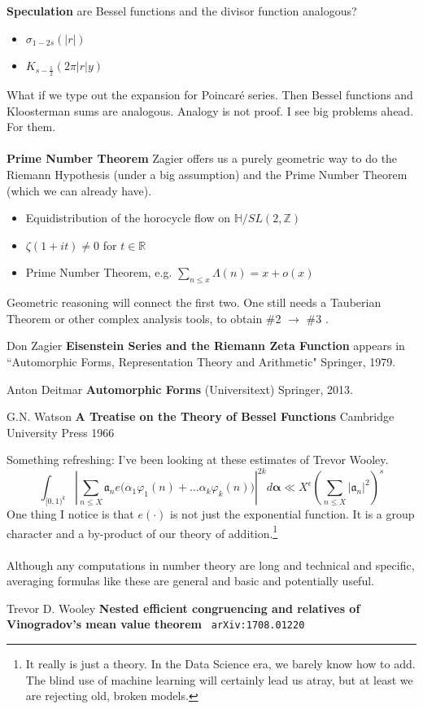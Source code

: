 \documentclass[12pt]{article}
\begin{document}
\textbf{\color{black!20!white}Speculation} are Bessel functions and the divisor function analogous?
\begin{itemize}
\item $\sigma_{1-2s}(|r|) $
\item $K_{s - \frac{1}{2}}(2\pi |r|y) $
\end{itemize}
What if we type out the expansion for Poincar\'{e} series.   Then Bessel functions and Kloosterman sums are analogous.  Analogy is not proof.  I see big problems ahead.  For them.  \\ \\
\textbf{\color{black!20!white!80!green}Prime Number Theorem} Zagier offers us a purely geometric way to do the Riemann Hypothesis (under a big assumption) and the Prime Number Theorem (which we can already have).
\begin{itemize}
\item Equidistribution of the horocycle flow on $\mathbb{H}/SL(2, \mathbb{Z})$
\item $\zeta(1 + it) \neq 0$ for $t \in \mathbb{R}$
\item Prime Number Theorem, e.g. $\sum_{n \leq x} \Lambda(n) = x +o(x)$
\end{itemize}
Geometric reasoning will connect the first two.  One still needs a Tauberian Theorem or other complex analysis tools, to obtain \#2 $\to$ \#3 .

\vfill
 
\begin{thebibliography}{}

\item Don Zagier \textbf{Eisenstein Series and the Riemann Zeta Function} appears in ``Automorphic Forms, Representation Theory and Arithmetic" Springer, 1979.

\item Anton Deitmar \textbf{Automorphic Forms} (Universitext) Springer, 2013.

\item G.N. Watson \textbf{A Treatise on the Theory of Bessel Functions} Cambridge University Press 1966 
\end{thebibliography}

\newpage

\noindent Something refreshing:  I've been looking at these estimates of Trevor Wooley.  
$$ \int_{[0,1)^k} \left| \sum_{n\leq X} \mathfrak{a}_n e \big( \alpha_1 \varphi_1(n) + \dots \alpha_k \varphi_k(n)\big) \right|^{2k} d\mathbf{\alpha}
 \ll X^\epsilon \left( \sum_{n\leq X} |\mathfrak{a}_n|^2 \right)^s $$
One thing I notice is that $e(\cdot)$ is not just the exponential function.  It is a group character and a by-product of our theory of addition.\footnote{It really is just a theory.  In the Data Science era, we barely know how to add.  The blind use of machine learning will certainly lead us atray, but at least we are rejecting old, broken models.}  \\ \\
Although any computations in number theory are long and technical and specific, averaging formulas like these are general and basic and potentially useful.

\vfill

\begin{thebibliography}{}

\item Trevor D. Wooley \textbf{Nested efficient congruencing and relatives of Vinogradov's mean value theorem} \texttt{ arXiv:1708.01220}
 
\end{thebibliography}
\end{document}

